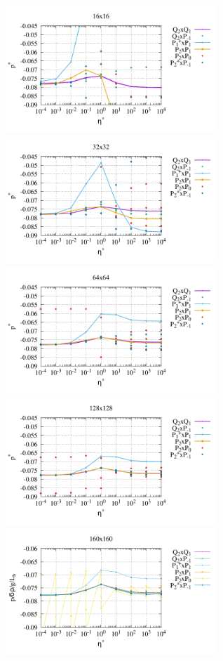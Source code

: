 \begin{center}
\includegraphics[width=8cm]{python_codes/fieldstone_120/paperresults/sinker_reduced/structured/sinker_reduced_press_16}
\includegraphics[width=8cm]{python_codes/fieldstone_120/paperresults/sinker_reduced/structured/sinker_reduced_press_32}\\
\includegraphics[width=8cm]{python_codes/fieldstone_120/paperresults/sinker_reduced/structured/sinker_reduced_press_64}
\includegraphics[width=8cm]{python_codes/fieldstone_120/paperresults/sinker_reduced/structured/sinker_reduced_press_128}\\
\includegraphics[width=8cm]{python_codes/fieldstone_120/paperresults/sinker_reduced/structured/sinker_reduced_press_160}\\
\end{center}




